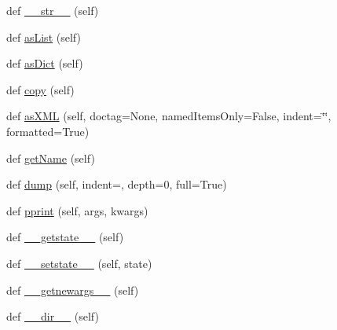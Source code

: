 \begin{DoxyCompactItemize}
\item 
def \hyperlink{classsetuptools_1_1__vendor_1_1pyparsing_1_1ParseResults_ae934d74868241471de4c79e0e70ffc17}{\+\_\+\+\_\+str\+\_\+\+\_\+} (self)
\item 
def \hyperlink{classsetuptools_1_1__vendor_1_1pyparsing_1_1ParseResults_a8d1cc9ef72b2fcf972c240eae0e59e87}{as\+List} (self)
\item 
def \hyperlink{classsetuptools_1_1__vendor_1_1pyparsing_1_1ParseResults_aa94e10c70716802a5bd2d265bbaa2f65}{as\+Dict} (self)
\item 
def \hyperlink{classsetuptools_1_1__vendor_1_1pyparsing_1_1ParseResults_a5783f341eb651c8c6e2f3b0713afe18b}{copy} (self)
\item 
def \hyperlink{classsetuptools_1_1__vendor_1_1pyparsing_1_1ParseResults_a1ef3733e1f8c5c2ad4a759b9c01809a9}{as\+X\+ML} (self, doctag=None, named\+Items\+Only=False, indent=\char`\"{}\char`\"{}, formatted=True)
\item 
def \hyperlink{classsetuptools_1_1__vendor_1_1pyparsing_1_1ParseResults_ab2ae7e5ea94c1e158d059aa90172f666}{get\+Name} (self)
\item 
def \hyperlink{classsetuptools_1_1__vendor_1_1pyparsing_1_1ParseResults_a1a4a3dd9ab26677a709fdcbb2289da04}{dump} (self, indent=\textquotesingle{}\textquotesingle{}, depth=0, full=True)
\item 
def \hyperlink{classsetuptools_1_1__vendor_1_1pyparsing_1_1ParseResults_a9222a3ef2d28e03e33d1133e56d34f80}{pprint} (self, args, kwargs)
\item 
def \hyperlink{classsetuptools_1_1__vendor_1_1pyparsing_1_1ParseResults_a8ac5d89ea8699d3cb6b601efeb6b9de9}{\+\_\+\+\_\+getstate\+\_\+\+\_\+} (self)
\item 
def \hyperlink{classsetuptools_1_1__vendor_1_1pyparsing_1_1ParseResults_a8efc6986ac4efd0d9bf56e80af46cc97}{\+\_\+\+\_\+setstate\+\_\+\+\_\+} (self, state)
\item 
def \hyperlink{classsetuptools_1_1__vendor_1_1pyparsing_1_1ParseResults_adf1b9139ba77e4e4512b00884948d09d}{\+\_\+\+\_\+getnewargs\+\_\+\+\_\+} (self)
\item 
def \hyperlink{classsetuptools_1_1__vendor_1_1pyparsing_1_1ParseResults_ae08d47601b2dd93b451b7df74b3d8b7c}{\+\_\+\+\_\+dir\+\_\+\+\_\+} (self)
\end{DoxyCompactItemize}
